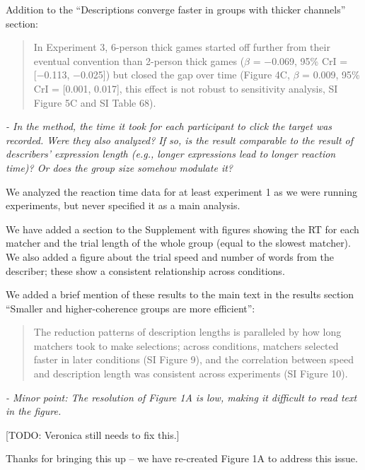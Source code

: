 \documentclass{stanfordletter}
\newcommand{\theysaid}[1]{\begin{leftbar} \noindent 
		\textsl{ #1}\end{leftbar}}
\newcommand{\revised}[1]{\begin{quote}	#1 \end{quote}}
\begin{document}
\begin{letter}{}
          	Addition to the ``Descriptions converge faster in groups with thicker channels'' section: 
          	\revised{In Experiment 3, 6-person thick games started off further
          		from their eventual convention than 2-person thick games ($\beta$ = −0.069, 95\% CrI = [−0.113, −0.025])
          		but closed the gap over time (Figure 4C, $\beta$ = 0.009, 95\% CrI = [0.001, 0.017], this effect is not robust to sensitivity analysis,
          		SI Figure 5C and SI Table 68).}
          	
          \theysaid{- In the method, the time it took for each participant to click the target was recorded. Were they also analyzed? If so, is the result comparable to the result of describers' expression length (e.g., longer expressions lead to longer reaction time)? Or does the group size somehow modulate it?}
          
          
          We analyzed the reaction time data for at least experiment 1 as we were running experiments, but never specified it as a main analysis. 
          
          We have added a section to the Supplement with figures showing the RT for each matcher and the trial length of the whole group (equal to the slowest matcher). We also added a figure about the trial speed and number of words from the describer; these show a consistent relationship across conditions. 
          
          We added a brief mention of these results to the main text in the results section ``Smaller and higher-coherence groups are more efficient'':
          
          \revised{The reduction patterns of description lengths is paralleled by how long matchers took to make selections; across conditions, matchers selected faster in later conditions (SI Figure 9), and the correlation between speed and description length was consistent across experiments (SI Figure 10). }
          
          \theysaid{- Minor point: The resolution of Figure 1A is low, making it difficult to read text in the figure.}
          
          [TODO: Veronica still needs to fix this.]
          
          Thanks for bringing this up -- we have re-created Figure 1A to address this issue. 
          

\end{letter}
\end{document}
